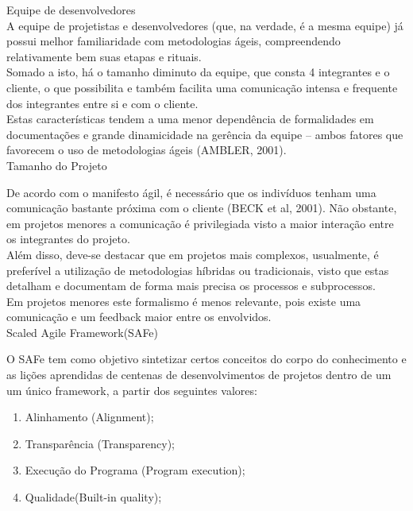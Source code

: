 \large{Equipe de desenvolvedores\\

\tab A equipe de projetistas e desenvolvedores (que, na verdade, é a mesma equipe) já possui melhor familiaridade com metodologias ágeis, compreendendo relativamente bem suas etapas e rituais. \\
\tab Somado a isto, há o tamanho diminuto da equipe, que consta 4 integrantes e o cliente, o que possibilita e também facilita uma comunicação intensa e frequente dos integrantes entre si e com o cliente. \\
\tab Estas características tendem a uma menor dependência de formalidades em documentações e grande dinamicidade na gerência da equipe – ambos fatores que favorecem o uso de metodologias ágeis (AMBLER, 2001). \\

\large{Tamanho do Projeto\\}

\tab De acordo com o manifesto ágil, é necessário que os indivíduos tenham uma comunicação bastante próxima com o cliente (BECK et al, 2001). Não obstante, em projetos menores a comunicação é privilegiada visto a maior interação entre os integrantes do projeto. \\
\tab Além disso, deve-se destacar que em projetos mais complexos, usualmente,  é preferível a utilização de metodologias híbridas ou tradicionais, visto que estas detalham e documentam de forma mais precisa os processos e subprocessos. \\
\tab Em projetos menores este formalismo é menos relevante, pois existe uma comunicação e um feedback maior entre os envolvidos. \\

\large{Scaled Agile Framework(SAFe)\\}

\tab O SAFe  tem como objetivo sintetizar certos conceitos do corpo do conhecimento e as lições aprendidas de centenas de desenvolvimentos de projetos  dentro de um um único framework, a partir dos seguintes valores:\\

\begin{enumerate}
	\item {Alinhamento (Alignment);} 
	\item {Transparência (Transparency);}
	\item {Execução do Programa (Program execution);} 
	\item {Qualidade(Built-in quality);}
\end{enumerate}

}
